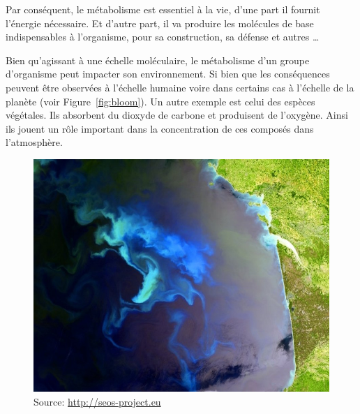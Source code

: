 \begin{refsegment}
    Par conséquent, le métabolisme est essentiel à la vie, d'une part il fournit l'énergie nécessaire. Et d'autre part, il va produire les molécules de base indispensables à l'organisme, pour sa construction, sa défense et autres \ldots
    
    Bien qu'agissant à une échelle moléculaire, le métabolisme d'un groupe d'organisme peut impacter son environnement. Si bien que les conséquences peuvent être observées à l'échelle humaine voire dans certains cas à l'échelle de la planète (voir Figure~\ref{fig:bloom}). Un autre exemple est celui des espèces végétales. Ils absorbent du dioxyde de carbone et produisent de l'oxygène. Ainsi ils jouent un rôle important dans la concentration de ces composés dans l’atmosphère.
    
    
    \begin{shadedfigure}
        \begin{subfigure}[b]{.5\textwidth}
            \centering
            \includegraphics[width=\textwidth]{img/bloom_gascogne.jpg}
            \caption{{\tiny Source: \url{http://seos-project.eu}}}
            \label{fig:bloom_gascogne}
        \end{subfigure}
        \hfill
        \begin{subfigure}[b]{.5\textwidth}
            \centering

\end{subfigure}
\end{shadedfigure}
\end{refsegment}
